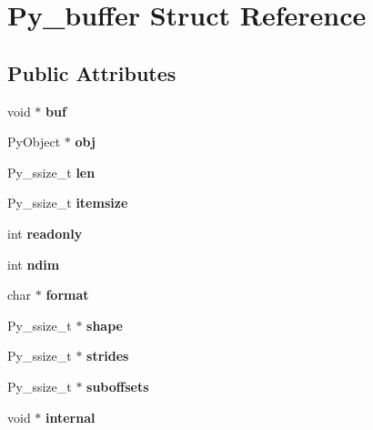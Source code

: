 \hypertarget{structPy__buffer}{
\section{Py\_\-buffer Struct Reference}
\label{structPy__buffer}
}
\subsection*{Public Attributes}
\begin{DoxyCompactItemize}
\item 
\hypertarget{structPy__buffer_acd4c7f597aa4da25b29a0a48320c3dbb}{
void $\ast$ {\bfseries buf}}
\label{structPy__buffer_acd4c7f597aa4da25b29a0a48320c3dbb}

\item 
\hypertarget{structPy__buffer_a82a6200c943129aef733d7accfe4746f}{
PyObject $\ast$ {\bfseries obj}}
\label{structPy__buffer_a82a6200c943129aef733d7accfe4746f}

\item 
\hypertarget{structPy__buffer_a483ee64f1491c16b2e35b840b9531892}{
Py\_\-ssize\_\-t {\bfseries len}}
\label{structPy__buffer_a483ee64f1491c16b2e35b840b9531892}

\item 
\hypertarget{structPy__buffer_a2c4ef3bf1e26c5bd4b968303aca61817}{
Py\_\-ssize\_\-t {\bfseries itemsize}}
\label{structPy__buffer_a2c4ef3bf1e26c5bd4b968303aca61817}

\item 
\hypertarget{structPy__buffer_a7504670b8c7dc73da34303ccaa1647e3}{
int {\bfseries readonly}}
\label{structPy__buffer_a7504670b8c7dc73da34303ccaa1647e3}

\item 
\hypertarget{structPy__buffer_abe900245be1dff2d90436cf0b17b7f4a}{
int {\bfseries ndim}}
\label{structPy__buffer_abe900245be1dff2d90436cf0b17b7f4a}

\item 
\hypertarget{structPy__buffer_a63bf89be88ff017e20923a8c6a12444c}{
char $\ast$ {\bfseries format}}
\label{structPy__buffer_a63bf89be88ff017e20923a8c6a12444c}

\item 
\hypertarget{structPy__buffer_a50031628382988cfdb9effad8138f063}{
Py\_\-ssize\_\-t $\ast$ {\bfseries shape}}
\label{structPy__buffer_a50031628382988cfdb9effad8138f063}

\item 
\hypertarget{structPy__buffer_af50c4e247d4839c684c1262bc05c8ecd}{
Py\_\-ssize\_\-t $\ast$ {\bfseries strides}}
\label{structPy__buffer_af50c4e247d4839c684c1262bc05c8ecd}

\item 
\hypertarget{structPy__buffer_ac6428a25e5d17a3f0d34f894571ab973}{
Py\_\-ssize\_\-t $\ast$ {\bfseries suboffsets}}
\label{structPy__buffer_ac6428a25e5d17a3f0d34f894571ab973}

\item 
\hypertarget{structPy__buffer_ac2e81f1fd8ef763e4f05572d4499139e}{
void $\ast$ {\bfseries internal}}
\label{structPy__buffer_ac2e81f1fd8ef763e4f05572d4499139e}

\end{DoxyCompactItemize}


